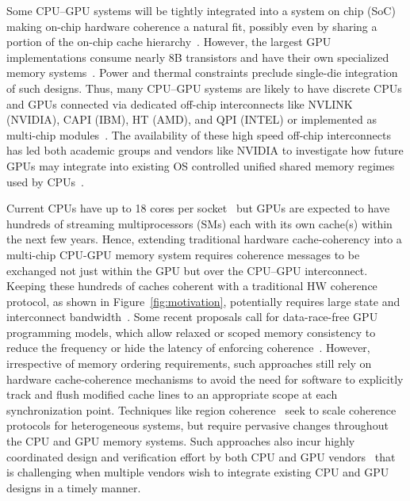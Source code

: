Some CPU--GPU systems will be tightly integrated into a system on chip (SoC) making on-chip 
hardware coherence a natural fit, possibly even by sharing a portion of the on-chip 
cache hierarchy~\cite{HSA,AMDAPU,Hechtman2014}.  However, the largest GPU 
implementations consume nearly 8B transistors and have their own 
specialized memory systems~\cite{NVIDIA8BILLION}.  
Power and thermal constraints preclude single-die integration of such designs. 
Thus, many CPU--GPU systems are likely to have 
discrete CPUs and GPUs connected via dedicated off-chip interconnects like 
NVLINK (NVIDIA), CAPI (IBM), HT (AMD), and QPI (INTEL) or implemented as 
multi-chip modules~\cite{NVLINK,CAPI,AMDHT,INTELQPI,Chen92}. The availability of these
high speed off-chip interconnects has led both academic groups and vendors like NVIDIA
to investigate how future GPUs may integrate into existing OS controlled 
unified shared memory regimes used by CPUs~\cite{Pichai2014,Power2014,Agarwal2015,Agarwal2015b}.

Current CPUs have up to 18 cores per socket~\cite{INTELXEONE5V3} but GPUs are
expected to have hundreds of streaming multiprocessors (SMs) each with its own
cache(s) within the next few years. Hence, extending traditional hardware
cache-coherency into a multi-chip CPU-GPU memory system requires coherence
messages to be exchanged not just within the GPU but over the CPU--GPU
interconnect. Keeping these hundreds of caches coherent with a traditional HW
coherence protocol, as shown in Figure~\ref{fig:motivation}, potentially
requires large state and interconnect bandwidth~\cite{Kelm2010,johnson2011}.
Some recent proposals call for data-race-free GPU programming models, which
allow relaxed or scoped memory consistency to reduce the frequency or hide the
latency of enforcing coherence~\cite{Hechtman2014}.  However, irrespective of
memory ordering requirements, such approaches still rely on hardware
cache-coherence mechanisms to  avoid the need for software to explicitly track
and flush modified cache lines to an appropriate scope at each synchronization
point. Techniques like region coherence~\cite{Power2013} seek to scale coherence
protocols for heterogeneous systems, but require pervasive changes throughout
the CPU and GPU memory systems. Such approaches also incur highly coordinated
design and verification effort by both CPU and GPU vendors~\cite{Hong2012} that
is challenging when multiple vendors wish to integrate existing CPU and GPU
designs in a timely manner.

